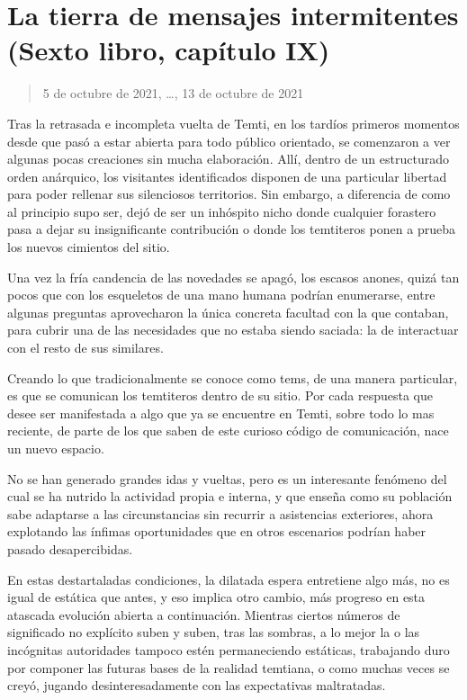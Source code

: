 \documentclass[
]{book}
\begin{document}
\hypertarget{la-tierra-de-mensajes-intermitentes-sexto-libro-capuxedtulo-ix}{%
\section{La tierra de mensajes intermitentes (Sexto libro, capítulo IX)}\label{la-tierra-de-mensajes-intermitentes-sexto-libro-capuxedtulo-ix}}

\begin{quote}
5 de octubre de 2021, \ldots, 13 de octubre de 2021
\end{quote}

Tras la retrasada e incompleta vuelta de Temti, en los tardíos primeros momentos desde que pasó a estar abierta para todo público orientado, se comenzaron a ver algunas pocas creaciones sin mucha elaboración. Allí, dentro de un estructurado orden anárquico, los visitantes identificados disponen de una particular libertad para poder rellenar sus silenciosos territorios. Sin embargo, a diferencia de como al principio supo ser, dejó de ser un inhóspito nicho donde cualquier forastero pasa a dejar su insignificante contribución o donde los temtiteros ponen a prueba los nuevos cimientos del sitio.

Una vez la fría candencia de las novedades se apagó, los escasos anones, quizá tan pocos que con los esqueletos de una mano humana podrían enumerarse, entre algunas preguntas aprovecharon la única concreta facultad con la que contaban, para cubrir una de las necesidades que no estaba siendo saciada: la de interactuar con el resto de sus similares.

Creando lo que tradicionalmente se conoce como tems, de una manera particular, es que se comunican los temtiteros dentro de su sitio. Por cada respuesta que desee ser manifestada a algo que ya se encuentre en Temti, sobre todo lo mas reciente, de parte de los que saben de este curioso código de comunicación, nace un nuevo espacio.

No se han generado grandes idas y vueltas, pero es un interesante fenómeno del cual se ha nutrido la actividad propia e interna, y que enseña como su población sabe adaptarse a las circunstancias sin recurrir a asistencias exteriores, ahora explotando las ínfimas oportunidades que en otros escenarios podrían haber pasado desapercibidas.

En estas destartaladas condiciones, la dilatada espera entretiene algo más, no es igual de estática que antes, y eso implica otro cambio, más progreso en esta atascada evolución abierta a continuación. Mientras ciertos números de significado no explícito suben y suben, tras las sombras, a lo mejor la o las incógnitas autoridades tampoco estén permaneciendo estáticas, trabajando duro por componer las futuras bases de la realidad temtiana, o como muchas veces se creyó, jugando desinteresadamente con las expectativas maltratadas.
\end{document}
